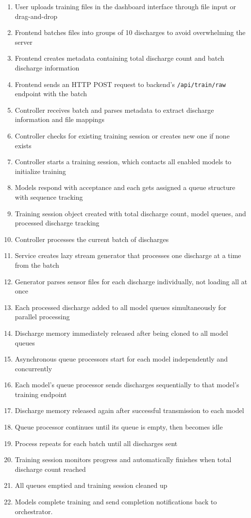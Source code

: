 \begin{enumerate}
    \item User uploads training files in the dashboard interface through file input or drag-and-drop
    \item Frontend batches files into groups of 10 discharges to avoid overwhelming the server
    \item Frontend creates metadata containing total discharge count and batch discharge information
    \item Frontend sends an HTTP POST request to backend's \texttt{/api/train/raw} endpoint with the batch
    \item Controller receives batch and parses metadata to extract discharge information and file mappings
    \item Controller checks for existing training session or creates new one if none exists
    \item Controller starts a training session, which contacts all enabled models to initialize training
    \item Models respond with acceptance and each gets assigned a queue structure with sequence tracking
    \item Training session object created with total discharge count, model queues, and processed discharge tracking
    \item Controller processes the current batch of discharges
    \item Service creates lazy stream generator that processes one discharge at a time from the batch
    \item Generator parses sensor files for each discharge individually, not loading all at once
    \item Each processed discharge added to all model queues simultaneously for parallel processing
    \item Discharge memory immediately released after being cloned to all model queues
    \item Asynchronous queue processors start for each model independently and concurrently
    \item Each model's queue processor sends discharges sequentially to that model's training endpoint
    \item Discharge memory released again after successful transmission to each model
    \item Queue processor continues until its queue is empty, then becomes idle
    \item Process repeats for each batch until all discharges sent
    \item Training session monitors progress and automatically finishes when total discharge count reached
    \item All queues emptied and training session cleaned up
    \item Models complete training and send completion notifications back to orchestrator.
\end{enumerate}

